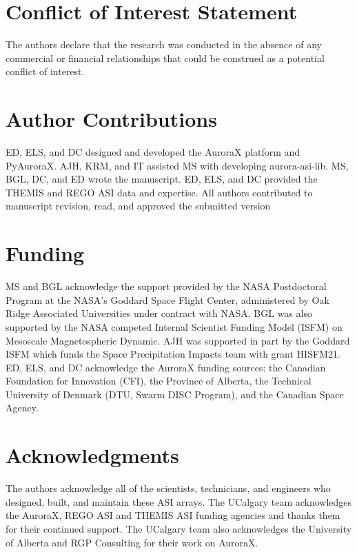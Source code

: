 \documentclass[utf8]{FrontiersinHarvard} %
\begin{document}
\section*{Conflict of Interest Statement}
The authors declare that the research was conducted in the absence of any commercial or financial relationships that could be construed as a potential conflict of interest.

\section*{Author Contributions}
ED, ELS, and DC designed and developed the AuroraX platform and PyAuroraX. AJH, KRM, and IT assisted MS with developing aurora-asi-lib. MS, BGL, DC, and ED wrote the manuscript. ED, ELS, and DC provided the THEMIS and REGO ASI data and expertise.  All authors contributed to manuscript revision, read, and approved the submitted version

\section*{Funding}
MS and BGL acknowledge the support provided by the NASA Postdoctoral Program at the NASA's Goddard Space Flight Center, administered by Oak Ridge Associated Universities under contract with NASA. BGL was also supported by the NASA competed Internal Scientist Funding Model (ISFM) on Mesoscale Magnetospheric Dynamic. AJH was supported in part by the Goddard ISFM which funds the Space Precipitation Impacts team with grant HISFM21. ED, ELS, and DC acknowledge the AuroraX funding sources: the Canadian Foundation for Innovation (CFI), the Province of Alberta, the Technical University of Denmark (DTU, Swarm DISC Program), and the Canadian Space Agency.

\section*{Acknowledgments}
The authors acknowledge all of the scientists, technicians, and engineers who designed, built, and maintain these ASI arrays. The UCalgary team acknowledges the AuroraX, REGO ASI and THEMIS ASI funding agencies and thanks them for their continued support. The UCalgary team also acknowledges the University of Alberta and RGP Consulting for their work on AuroraX. 
\end{document}
